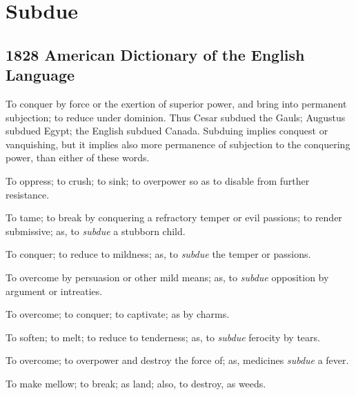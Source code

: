 \section{Subdue}
	\label{SUBDUE}
	

\subsection{1828 American Dictionary of the English Language} %
	\label{SUBDUE-1828}

	\begin{compactitem}
		\item[1] To conquer by force or the exertion of superior power, and bring into permanent subjection; to reduce under dominion. Thus Cesar subdued the Gauls; Augustus subdued Egypt; the English subdued Canada. Subduing implies conquest or vanquishing, but it implies also more permanence of subjection to the conquering power, than either of these words.
		\item[2] To oppress; to crush; to sink; to overpower so as to disable from further resistance.
		\item[3] To tame; to break by conquering a refractory temper or evil passions; to render submissive; as, to \textit{subdue} a stubborn child.
		\item[4] To conquer; to reduce to mildness; as, to \textit{subdue} the temper or passions.
		\item[5] To overcome by persuasion or other mild means; as, to \textit{subdue} opposition by argument or intreaties.
		\item[6] To overcome; to conquer; to captivate; as by charms.
		\item[7] To soften; to melt; to reduce to tenderness; as, to \textit{subdue} ferocity by tears.
		\item[8] To overcome; to overpower and destroy the force of; as, medicines \textit{subdue} a fever.
		\item[9] To make mellow; to break; as land; also, to destroy, as weeds.
	\end{compactitem}

